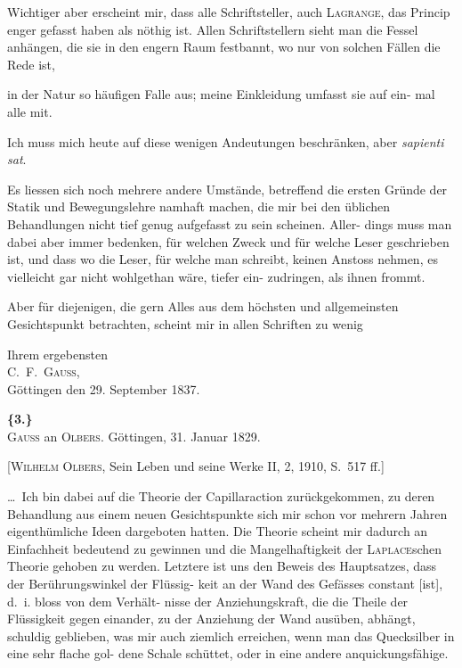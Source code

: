 \documentclass[12pt,a4paper]{article}
\theoremstyle{plain}
\theoremstyle{definition}
\theoremstyle{remark}
\begin{document}
Wichtiger aber erscheint mir, dass alle Schriftsteller, auch \textsc{Lagrange}, das
Princip enger gefasst haben als n\"othig ist. Allen Schriftstellern sieht man
die Fessel anh\"angen, die sie in den engern Raum festbannt, wo nur von
solchen F\"allen die Rede ist, 

\newpage


in der Natur so h\"aufigen Falle aus; meine Einkleidung umfasst sie auf ein-
mal alle mit.

Ich muss mich heute auf diese wenigen Andeutungen beschr\"anken, aber
\textit{sapienti sat}.

Es liessen sich noch mehrere andere Umst\"ande, betreffend die ersten
Gr\"unde der Statik und Bewegungslehre namhaft machen, die mir bei den
\"ublichen Behandlungen nicht tief genug aufgefasst zu sein scheinen. Aller-
dings muss man dabei aber immer bedenken, f\"ur welchen Zweck und f\"ur
welche Leser geschrieben ist, und dass wo die Leser, f\"ur welche man schreibt,
keinen Anstoss nehmen, es vielleicht gar nicht wohlgethan w\"are, tiefer ein-
zudringen, als ihnen frommt.

Aber f\"ur diejenigen, die gern Alles aus dem h\"ochsten und allgemeinsten
Gesichtspunkt betrachten, scheint mir in allen Schriften zu wenig

\vspace{0.5cm}
\begin{flushright}
Ihrem ergebensten\\
\textsc{C.~F.~Gauss,}\\
G\"ottingen den 29. September 1837.
\end{flushright}

\vspace{0.5cm}

\noindent\textbf{\{3.\}}\\
\textsc{Gauss} an \textsc{Olbers}. G\"ottingen, 31. Januar 1829.

\vspace{0.2cm}
{\small[\textsc{Wilhelm Olbers}, Sein Leben und seine Werke II, 2, 1910, S.~517 ff.]}

\vspace{0.3cm}

\ldots\ Ich bin dabei auf die Theorie der Capillaraction
zur\"uckgekommen, zu deren Behandlung aus einem neuen Gesichtspunkte sich
mir schon vor mehrern Jahren eigenth\"umliche Ideen dargeboten hatten. Die
Theorie scheint mir dadurch an Einfachheit bedeutend zu gewinnen und die
Mangelhaftigkeit der \textsc{Laplace}schen Theorie gehoben zu werden. Letztere
ist uns den Beweis des Hauptsatzes, dass der Ber\"uhrungswinkel der Fl\"ussig-
keit an der Wand des Gef\"asses constant [ist], d.~i. bloss von dem Verh\"alt-
nisse der Anziehungskraft, die die Theile der Fl\"ussigkeit gegen einander, zu
der Anziehung der Wand aus\"uben, abh\"angt, schuldig geblieben, was mir
auch ziemlich erreichen, wenn man das Quecksilber in eine sehr flache gol-
dene Schale sch\"uttet, oder in eine andere anquickungsf\"ahige.
\end{document}
